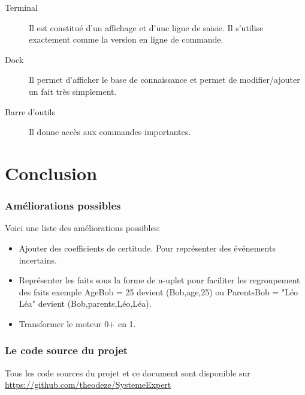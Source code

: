 \documentclass[a4paper, 11pt]{article}
\begin{document}
\begin{description}
    \item[Terminal] Il est constitué d'un affichage et d'une ligne de saisie. Il s'utilise exactement comme la version en ligne de commande.
    \item[Dock] Il permet d'afficher le base de connaissance et permet de modifier/ajouter un fait très simplement.
    \item[Barre d'outils] Il donne accès aux commandes importantes.
\end{description}

\part{Conclusion}

\section{Améliorations possibles}

Voici une liste des améliorations possibles:

\begin{itemize}
    \item Ajouter des coefficients de certitude. Pour représenter des événements incertains.
    \item Représenter les faits sous la forme de n-uplet pour faciliter les regroupement des faits exemple AgeBob = 25 devient (Bob,age,25) ou ParentsBob = "Léo Léa" devient (Bob,parents,Léo,Léa).
    \item Transformer le moteur 0+ en 1.
\end{itemize}

\section{Le code source du projet}

Tous les code sources du projet et ce document sont disponible sur \url{https://github.com/theodeze/SystemeExpert}
\end{document}
